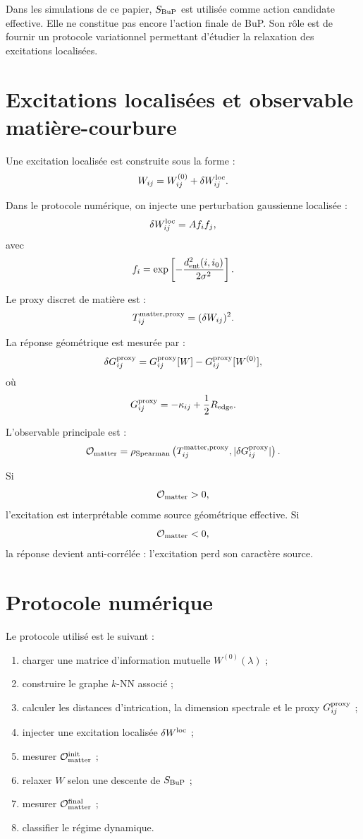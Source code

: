 \documentclass[11pt,a4paper]{article}
\begin{document}
Dans les simulations de ce papier, \(S_{\rm BuP}\) est utilisée comme action
candidate effective. Elle ne constitue pas encore l'action finale de BuP. Son
rôle est de fournir un protocole variationnel permettant d'étudier la relaxation
des excitations localisées.

\section{Excitations localisées et observable matière-courbure}

Une excitation localisée est construite sous la forme :
\[
W_{ij}
=
W_{ij}^{(0)}
+
\delta W_{ij}^{\rm loc}.
\]

Dans le protocole numérique, on injecte une perturbation gaussienne localisée :
\[
\delta W_{ij}^{\rm loc}
=
A f_i f_j,
\]
avec
\[
f_i
=
\exp
\left[
-\frac{d_{\rm ent}^2(i,i_0)}{2\sigma^2}
\right].
\]

Le proxy discret de matière est :
\[
T_{ij}^{\rm matter,proxy}
=
(\delta W_{ij})^2.
\]

La réponse géométrique est mesurée par :
\[
\delta G_{ij}^{\rm proxy}
=
G_{ij}^{\rm proxy}[W]
-
G_{ij}^{\rm proxy}[W^{(0)}],
\]
où
\[
G_{ij}^{\rm proxy}
=
-\kappa_{ij}
+
\frac12R_{\rm edge}.
\]

L'observable principale est :
\[
\mathcal{O}_{\rm matter}
=
\rho_{\rm Spearman}
\left(
T_{ij}^{\rm matter,proxy},
|\delta G_{ij}^{\rm proxy}|
\right).
\]

Si
\[
\mathcal{O}_{\rm matter}>0,
\]
l'excitation est interprétable comme source géométrique effective.
Si
\[
\mathcal{O}_{\rm matter}<0,
\]
la réponse devient anti-corrélée : l'excitation perd son caractère source.

\section{Protocole numérique}

Le protocole utilisé est le suivant :

\begin{enumerate}
  \item charger une matrice d'information mutuelle \(W^{(0)}(\lambda)\) ;
  \item construire le graphe \(k\)-NN associé ;
  \item calculer les distances d'intrication, la dimension spectrale et le proxy \(G_{ij}^{\rm proxy}\) ;
  \item injecter une excitation localisée \(\delta W^{\rm loc}\) ;
  \item mesurer \(\mathcal{O}_{\rm matter}^{\rm init}\) ;
  \item relaxer \(W\) selon une descente de \(S_{\rm BuP}\) ;
  \item mesurer \(\mathcal{O}_{\rm matter}^{\rm final}\) ;
  \item classifier le régime dynamique.
\end{enumerate}
\end{document}
